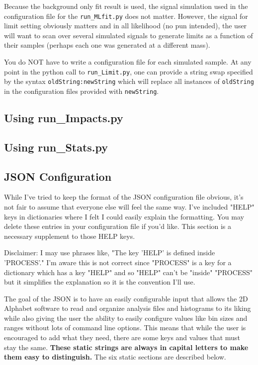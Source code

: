\documentclass[letter]{article}
\begin{document}
        Because the background only fit result is used, the signal simulation used in the configuration file for the \verb"run_MLfit.py" does not matter. However, the signal for limit setting obviously matters and in all likelihood (no pun intended), the user will want to scan over several simulated signals to generate limits as a function of their samples (perhaps each one was generated at a different mass). 

        You do NOT have to write a configuration file for each simulated sample. At any point in the python call to \verb"run_Limit.py", one can provide a string swap specified by the syntax \verb"oldString:newString" which will replace all instances of \verb"oldString" in the configuration files provided with \verb"newString".

    \subsection{Using run\_Impacts.py}

    \subsection{Using run\_Stats.py}

    \subsection{JSON Configuration}
        While I've tried to keep the format of the JSON configuration file obvious, it's not fair to assume that everyone else will feel the same way. I've included "HELP" keys in dictionaries where I felt I could easily explain the formatting. You may delete these entries in your configuration file if you'd like. This section is a necessary supplement to those HELP keys. 

        Disclaimer: I may use phrases like, "The key 'HELP' is defined inside 'PROCESS'." I'm aware this is not correct since "PROCESS" is a key for a dictionary which has a key "HELP" and so "HELP" can't be "inside" "PROCESS" but it simplifies the explanation so it is the convention I'll use.  

        The goal of the JSON is to have an easily configurable input that allows the 2D Alphabet software to read and organize analysis files and histograms to its liking while also giving the user the ability to easily configure values like bin sizes and ranges without lots of command line options. This means that while the user is encouraged to add what they need, there are some keys and values that must stay the same. \textbf{These static strings are always in capital letters to make them easy to distinguish.} The six static sections are described below.
\end{document}
